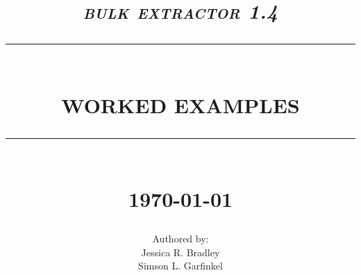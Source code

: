 \begin{titlepage}





%



\newcommand{\TRule}[1]{\rule{\linewidth}{#1}} 	%

\makeatletter							%
\def\printtitle{%
    {\centering \@title\par}}
\makeatother									

\makeatletter							%
\def\printauthor{%
    {\centering \large \@author}}				
\makeatother							

\title{	\LARGE \textsc{\textit{bulk extractor 1.4}} 	%
		 	\\[1.0cm]													%
			\TRule{0.5pt} \\										%
			\LARGE \textbf{\uppercase{Worked Examples}}	%
			\TRule{2pt} \\ [0.5cm]								%
			\normalsize \today									%
		}
\author{
		Authored by: \\
		Jessica R. Bradley\\
		Simson L. Garfinkel\\		
}

\thispagestyle{empty}				%

\printtitle									%
  	\vfill
\printauthor								%














\end{titlepage}
